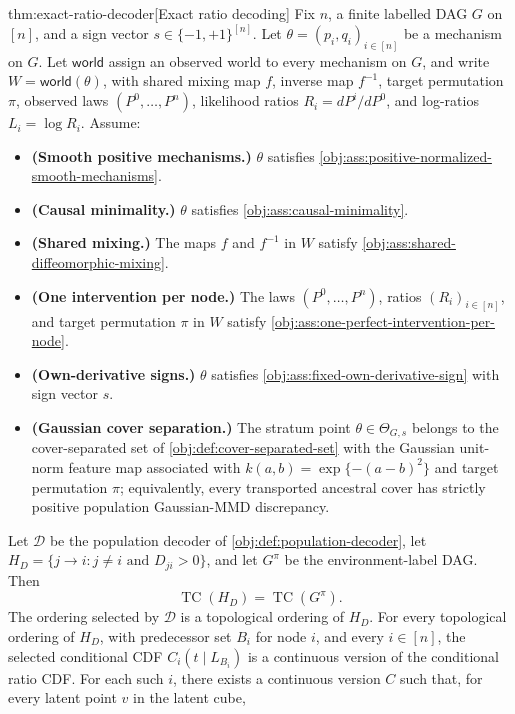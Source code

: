 \documentclass[11pt]{article}
\begin{document}
\begin{theoremv}{thm:exact-ratio-decoder}[Exact ratio decoding]
Fix \(n\), a finite labelled DAG \(G\) on \([n]\), and a sign vector \(s\in\{-1,+1\}^{[n]}\). Let \(\theta=(p_i,q_i)_{i\in[n]}\) be a mechanism on \(G\). Let \(\mathsf{world}\) assign an observed world to every mechanism on \(G\), and write \(W=\mathsf{world}(\theta)\), with shared mixing map \(f\), inverse map \(f^{-1}\), target permutation \(\pi\), observed laws \((P^0,\ldots,P^n)\), likelihood ratios \(R_i=dP^i/dP^0\), and log-ratios \(L_i=\log R_i\). Assume:
\begin{itemize}
\item \textbf{(Smooth positive mechanisms.)} \(\theta\) satisfies \cref{obj:ass:positive-normalized-smooth-mechanisms}.
\item \textbf{(Causal minimality.)} \(\theta\) satisfies \cref{obj:ass:causal-minimality}.
\item \textbf{(Shared mixing.)} The maps \(f\) and \(f^{-1}\) in \(W\) satisfy \cref{obj:ass:shared-diffeomorphic-mixing}.
\item \textbf{(One intervention per node.)} The laws \((P^0,\ldots,P^n)\), ratios \((R_i)_{i\in[n]}\), and target permutation \(\pi\) in \(W\) satisfy \cref{obj:ass:one-perfect-intervention-per-node}.
\item \textbf{(Own-derivative signs.)} \(\theta\) satisfies \cref{obj:ass:fixed-own-derivative-sign} with sign vector \(s\).
\item \textbf{(Gaussian cover separation.)} The stratum point \(\theta\in\Theta_{G,s}\) belongs to the cover-separated set of \cref{obj:def:cover-separated-set} with the Gaussian unit-norm feature map associated with \(k(a,b)=\exp\{-(a-b)^2\}\) and target permutation \(\pi\); equivalently, every transported ancestral cover has strictly positive population Gaussian-MMD discrepancy.
\end{itemize}
Let \(\mathscr D\) be the population decoder of \cref{obj:def:population-decoder}, let \(H_D=\{j\to i:j\ne i\text{ and }D_{ji}>0\}\), and let \(G^\pi\) be the environment-label DAG. Then
\[
\operatorname{TC}(H_D)=\operatorname{TC}(G^\pi).
\]
The ordering selected by \(\mathscr D\) is a topological ordering of \(H_D\). For every topological ordering of \(H_D\), with predecessor set \(B_i\) for node \(i\), and every \(i\in[n]\), the selected conditional CDF \(C_i(t\mid L_{B_i})\) is a continuous version of the conditional ratio CDF. For each such \(i\), there exists a continuous version \(C\) such that, for every latent point \(v\) in the latent cube,

\end{theoremv}
\end{document}
